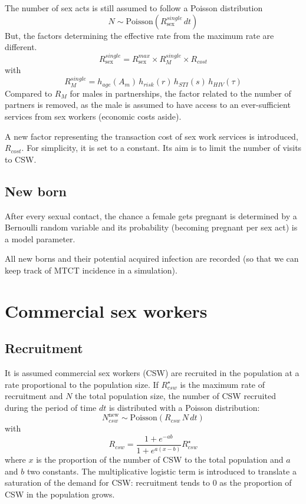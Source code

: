\documentclass[11pt, onecolumn]{article}
\begin{document}
The number of sex acts is still assumed to follow a Poisson distribution
$$N\sim \mathrm{Poisson}(R_{\mathrm{sex}}^{single}\, dt)$$
But, the factors determining the effective rate from the maximum rate are different.
$$R_{\mathrm{sex}}^{single} = R_{\mathrm{sex}}^{max} \times R_{M}^{single} \times R_{cost} $$
with 
$$R_M^{single}= h_{age}(A_m)  \, h_{risk}(r) \,h_{STI}(s) \,h_{HIV}(\tau)  $$
Compared to $R_M$ for males in partnerships, the factor related to the number of partners is removed, as the male is assumed to have access to an ever-sufficient services from sex workers (economic costs aside).

A new factor representing the transaction cost of sex work services is introduced, $R_{cost}$. For simplicity, it is set to a constant. Its aim is to limit the number of visits to CSW.


\subsection{New born}

After every sexual contact, the chance a female gets pregnant is determined by a Bernoulli random variable and its probability (becoming pregnant per sex act) is a model parameter. 

All new borns and their potential acquired infection are recorded (so that we can keep track of MTCT incidence in a simulation).




\section{Commercial sex workers}

\subsection{Recruitment}

It is assumed commercial sex workers (CSW) are recruited in the population at a rate proportional to the population size. If $R_{csw}^{\star}$ is the maximum rate of recruitment and $N$ the total population size, the number of CSW recruited during the period of time $dt$ is distributed with a Poisson distribution:
$$N_{csw}^{\mathrm{new}} \sim \text{Poisson}\left(R_{csw}\,N\,dt\right)$$
with 
$$ R_{csw} = \frac{1+e^{-ab}}{1+e^{a(x-b)}}R_{csw}^{\star}$$
where $x$ is the proportion of the number of CSW to the total population and $a$ and $b$ two constants. The multiplicative logistic term is introduced to translate a saturation of the demand for CSW: recruitment tends to 0 as the proportion of CSW in the population grows.
\end{document}
